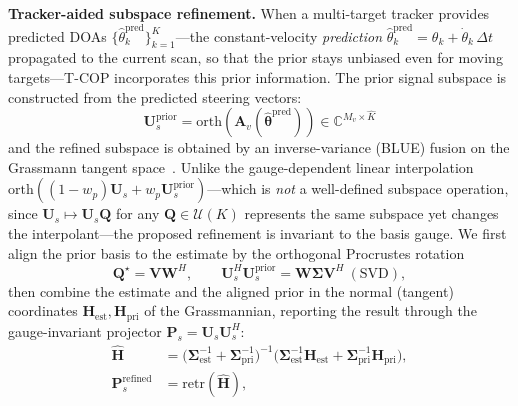 \documentclass[journal]{IEEEtran}
\newcommand{\vect}[1]{\boldsymbol{#1}}
\newcommand{\mat}[1]{\mathbf{#1}}
\newcommand{\C}{\mathbb{C}}
\begin{document}
\textbf{Tracker-aided subspace refinement.}
When a multi-target tracker provides predicted DOAs $\{\hat{\theta}_k^{\mathrm{pred}}\}_{k=1}^{\hat{K}}$---the constant-velocity \emph{prediction} $\hat{\theta}_k^{\mathrm{pred}}=\theta_k+\dot{\theta}_k\,\Delta t$ propagated to the current scan, so that the prior stays unbiased even for moving targets---T-COP incorporates this prior information. The prior signal subspace is constructed from the predicted steering vectors:
\begin{equation}
\mat{U}_s^{\mathrm{prior}} = \mathrm{orth}\!\left(\mat{A}_v(\hat{\vect{\theta}}^{\mathrm{pred}})\right) \in \C^{M_v \times \hat{K}}
\label{eq:tcop_prior_subspace}
\end{equation}
and the refined subspace is obtained by an inverse-variance (BLUE) fusion on the Grassmann tangent space~\cite{edelman1998geometry}. Unlike the gauge-dependent linear interpolation $\mathrm{orth}\!\left((1{-}w_p)\mat{U}_s + w_p\mat{U}_s^{\mathrm{prior}}\right)$---which is \emph{not} a well-defined subspace operation, since $\mat{U}_s\!\mapsto\!\mat{U}_s\mat{Q}$ for any $\mat{Q}\in\mathcal{U}(K)$ represents the same subspace yet changes the interpolant---the proposed refinement is invariant to the basis gauge. We first align the prior basis to the estimate by the orthogonal Procrustes rotation
\begin{equation}
\mat{Q}^\star=\mat{V}\mat{W}^H,\qquad \mat{U}_s^H\mat{U}_s^{\mathrm{prior}}=\mat{W}\mat{\Sigma}\mat{V}^H\ (\text{SVD}),
\label{eq:tcop_procrustes}
\end{equation}
then combine the estimate and the aligned prior in the normal (tangent) coordinates $\mat{H}_{\mathrm{est}},\mat{H}_{\mathrm{pri}}$ of the Grassmannian, reporting the result through the gauge-invariant projector $\mat{P}_s=\mat{U}_s\mat{U}_s^H$:
\begin{equation}
\begin{split}
\hat{\mat{H}}&=\big(\mat{\Sigma}_{\mathrm{est}}^{-1}+\mat{\Sigma}_{\mathrm{pri}}^{-1}\big)^{-1}\big(\mat{\Sigma}_{\mathrm{est}}^{-1}\mat{H}_{\mathrm{est}}+\mat{\Sigma}_{\mathrm{pri}}^{-1}\mat{H}_{\mathrm{pri}}\big),\\
\mat{P}_s^{\mathrm{refined}}&=\mathrm{retr}(\hat{\mat{H}}),
\end{split}
\label{eq:tcop_prior}
\end{equation}
\end{document}
